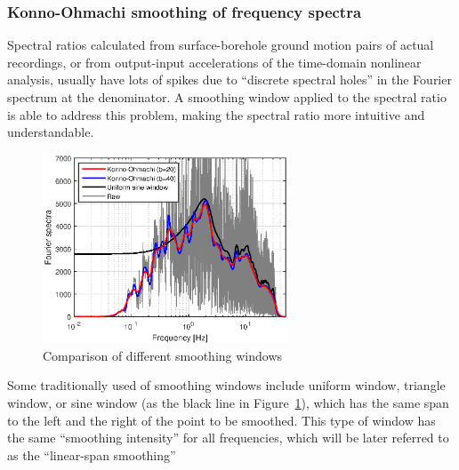 \documentclass[11pt,letterpaper]{article}
\begin{document}
\subsubsection{Konno-Ohmachi smoothing of frequency spectra}\label{sec:konno-ohmachi}

Spectral ratios calculated from surface-borehole ground motion pairs of actual recordings, or from output-input accelerations of the time-domain nonlinear analysis, usually have lots of spikes due to ``discrete spectral holes'' in the Fourier spectrum at the denominator. A smoothing window applied to the spectral ratio is able to address this problem, making the spectral ratio more intuitive and understandable.

\begin{figure}[h]
	\centering
	\includegraphics[width=0.65\textwidth]{different_smoothing_windows.eps}
	\caption{Comparison of different smoothing windows}\label{fig:different_smoothing_windows}
\end{figure}

Some traditionally used of smoothing windows include uniform window, triangle window, or sine window (as the black line in Figure~\ref{fig:different_smoothing_windows}), which has the same span to the left and the right of the point to be smoothed. This type of window has the same ``smoothing intensity'' for all frequencies, which will be later referred to as the ``linear-span smoothing''
\end{document}
